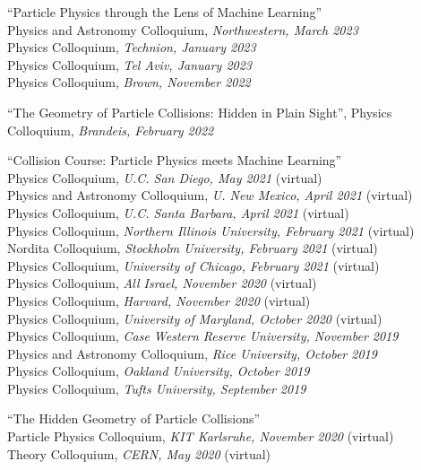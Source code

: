 \bbl

\item ``Particle Physics through the Lens of Machine Learning''
\\ Physics and Astronomy Colloquium, \emph{Northwestern, March 2023}
\\ Physics Colloquium, \emph{Technion, January 2023}
\\ Physics Colloquium, \emph{Tel Aviv, January 2023}
\\ Physics Colloquium, \emph{Brown, November 2022}

\item ``The Geometry of Particle Collisions: Hidden in Plain Sight'', Physics Colloquium, \emph{Brandeis, February 2022}

\item ``Collision Course:  Particle Physics meets Machine Learning''
\\ Physics Colloquium, \emph{U.C. San Diego, May 2021} (virtual)
\\ Physics and Astronomy Colloquium, \emph{U. New Mexico, April 2021} (virtual)
\\ Physics Colloquium, \emph{U.C. Santa Barbara, April 2021} (virtual)
\\ Physics Colloquium, \emph{Northern Illinois University, February 2021} (virtual)
\\ Nordita Colloquium, \emph{Stockholm University, February 2021} (virtual)
\\ Physics Colloquium, \emph{University of Chicago, February 2021} (virtual)
\\ Physics Colloquium, \emph{All Israel, November 2020} (virtual)
\\ Physics Colloquium, \emph{Harvard, November 2020} (virtual)
\\ Physics Colloquium, \emph{University of Maryland, October 2020} (virtual)
\\ Physics Colloquium, \emph{Case Western Reserve University, November 2019}
\\ Physics and Astronomy Colloquium, \emph{Rice University, October 2019}
\\ Physics Colloquium, \emph{Oakland University, October 2019}
\\ Physics Colloquium, \emph{Tufts University, September 2019}

\item ``The Hidden Geometry of Particle Collisions''
\\ Particle Physics Colloquium, \emph{KIT Karlsruhe, November 2020} (virtual)
\\ Theory Colloquium, \emph{CERN, May 2020} (virtual)

